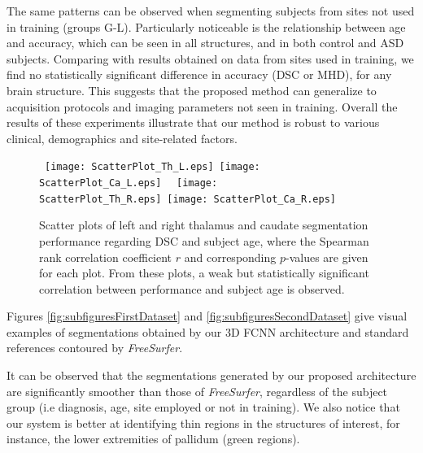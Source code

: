\documentclass[twoside,fleqn,espcrc2]{elsarticle}
\newcommand{\FreeSurfer}{\textit{FreeSurfer}}
\begin{document}
The same patterns can be observed when segmenting subjects from sites not used in training (groups G-L). Particularly noticeable is the relationship between age and accuracy, which can be seen in all structures, and in both control and ASD subjects. Comparing with results obtained on data from sites used in training, we find no statistically significant difference in accuracy (DSC or MHD), for any brain structure. This suggests that the proposed method can generalize to acquisition protocols and imaging parameters not seen in training. Overall the results of these experiments illustrate that our method is robust to various clinical, demographics and site-related factors.    

\begin{figure}[h!]
     \begin{center}
     \mbox{
        \texttt{[image: ScatterPlot\_Th\_L.eps]}
        \texttt{[image: ScatterPlot\_Ca\_L.eps]}
     }
     \mbox{
        \texttt{[image: ScatterPlot\_Th\_R.eps]}
        \texttt{[image: ScatterPlot\_Ca\_R.eps]}
     }
     
        \caption{Scatter plots of left and right thalamus and caudate segmentation performance regarding DSC and subject age, where the Spearman rank correlation coefficient $r$ and corresponding $p$-values are given for each plot. From these plots, a weak but statistically significant correlation between performance and subject age is observed.}
        \label{fig:scat}
\end{center}        
\end{figure}



Figures \ref{fig:subfiguresFirstDataset} and \ref{fig:subfiguresSecondDataset} give visual examples of segmentations obtained by our 3D FCNN architecture and standard references contoured by \FreeSurfer{}.
 
It can be observed that the segmentations generated by our proposed architecture are significantly smoother than those of \FreeSurfer{}, regardless of the subject group (i.e diagnosis, age, site employed or not in training). We also notice that our system is better at identifying thin regions in the structures of interest, for instance, the lower extremities of pallidum (green regions).
\end{document}
